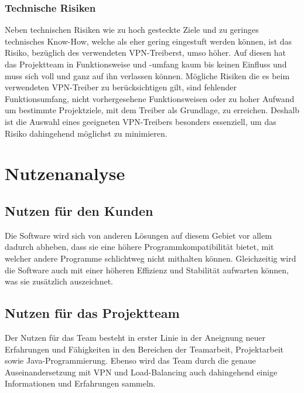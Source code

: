 \documentclass[a4paper,12pt]{scrreprt}
\begin{document}
		
		\subsection{Technische Risiken}
	Neben technischen Risiken wie zu hoch gesteckte Ziele und zu geringes technisches Know-How, welche als eher gering eingestuft werden können, ist das Risiko, bezüglich des  verwendeten VPN-Treiberst, umso höher. Auf diesen hat das Projektteam in Funktionsweise und -umfang kaum bis keinen Einfluss und muss sich voll und ganz auf ihn verlassen können. Mögliche Risiken die es beim verwendeten VPN-Treiber zu berücksichtigen gilt, sind fehlender Funktionsumfang, nicht vorhergesehene Funktionsweisen oder zu hoher Aufwand um bestimmte Projektziele, mit dem Treiber als Grundlage, zu erreichen. Deshalb ist die Auswahl eines geeigneten VPN-Treibers besonders essenziell, um das Risiko dahingehend möglichst zu minimieren. 
		
			
\chapter{Nutzenanalyse}
	
	\section{Nutzen f\"ur den Kunden}
	
	Die Software wird sich von anderen Lösungen auf diesem Gebiet vor allem dadurch abheben, dass sie eine höhere Programmkompatibilität bietet, mit welcher andere Programme schlichtweg nicht mithalten können. Gleichzeitig wird die Software auch mit einer höheren Effizienz und Stabilität aufwarten können, was sie zusätzlich auszeichnet.
	
	\section{Nutzen f\"ur das Projektteam}
	
	Der Nutzen für das Team besteht in erster Linie in der Aneignung neuer Erfahrungen und Fähigkeiten in den Bereichen der Teamarbeit, Projektarbeit sowie Java-Programmierung. Ebenso wird das Team durch die genaue Auseinandersetzung mit VPN und Load-Balancing auch dahingehend einige Informationen und Erfahrungen sammeln.
	
\end{document}

